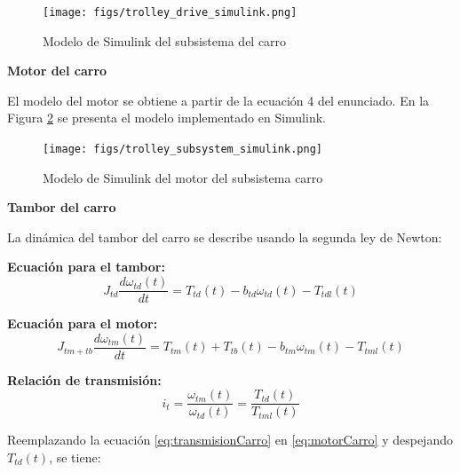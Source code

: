 \documentclass{article}
\begin{document}
            \begin{figure} [H]
                \centering
                \texttt{[image: figs/trolley\_drive\_simulink.png]}
                \caption{Modelo de Simulink del subsistema del carro}
                \label{fig:trolley_drive_simulink}
            \end{figure}
            
            \textbf{Motor del carro}
            
            El modelo del motor se obtiene a partir de la ecuación 4 del enunciado. En la Figura \ref{fig:trolley_subsystem_simulink} se presenta el modelo implementado en Simulink.
            
            \begin{figure} [H]
                \centering
                \texttt{[image: figs/trolley\_subsystem\_simulink.png]}
                \caption{Modelo de Simulink del motor del subsistema carro}
                \label{fig:trolley_subsystem_simulink}
            \end{figure}
            
            \textbf{Tambor del carro}
            
            La dinámica del tambor del carro se describe usando la segunda ley de Newton:
            
            \textbf{Ecuación para el tambor:}
            \begin{equation} \label{eq:tamborCarro}
                J_{td} \frac{d \omega_{td}(t)}{dt} = T_{td}(t) - b_{td} \omega_{td}(t) - T_{tdl}(t)
            \end{equation}
            
            \textbf{Ecuación para el motor:}
            \begin{equation} \label{eq:motorCarro}
                J_{tm+tb} \frac{d \omega_{tm}(t)}{dt} = T_{tm}(t) + T_{tb}(t) - b_{tm} \omega_{tm}(t) - T_{tml}(t)
            \end{equation}
            
            \textbf{Relación de transmisión:}
            \begin{equation} \label{eq:transmisionCarro}
                i_t = \frac{\omega_{tm}(t)}{\omega_{td}(t)} = \frac{T_{td}(t)}{T_{tml}(t)}
            \end{equation}
            
            Reemplazando la ecuación \ref{eq:transmisionCarro} en \ref{eq:motorCarro} y despejando $T_{td}(t)$, se tiene:
            
\end{document}
